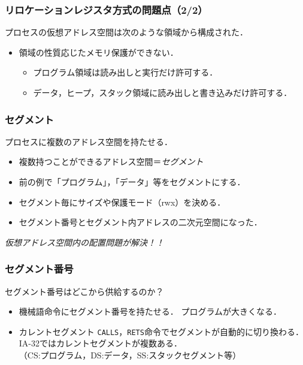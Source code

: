 \documentclass[unicode,handout]{beamer}                   %
\begin{document}
\begin{frame}
  \frametitle{リロケーションレジスタ方式の問題点（2/2）}
  プロセスの仮想アドレス空間は次のような領域から構成された．
  \vspace{3mm}
  \begin{itemize}
  \item 領域の性質応じたメモリ保護ができない．\\
    \begin{itemize}
    \item プログラム領域は読み出しと実行だけ許可する．
    \item データ，ヒープ，スタック領域に読み出しと書き込みだけ許可する．
    \end{itemize}
  \end{itemize}
\end{frame}

\begin{frame}
  \frametitle{セグメント}
  プロセスに複数のアドレス空間を持たせる．
  \vspace{3mm}
  \begin{itemize}
  \item 複数持つことができるアドレス空間＝\emph{セグメント}
  \item 前の例で「プログラム」，「データ」等をセグメントにする．
  \item セグメント毎にサイズや保護モード（rwx）を決める．
  \item セグメント番号とセグメント内アドレスの二次元空間になった．
  \end{itemize}
  \emph{仮想アドレス空間内の配置問題が解決！！}
\end{frame}

\begin{frame}
  \frametitle{セグメント番号}
  セグメント番号はどこから供給するのか？
  \begin{itemize}
  \item 機械語命令にセグメント番号を持たせる．
    \vspace{3mm}
    プログラムが大きくなる．
  \item カレントセグメント
    \texttt{CALLS}，\texttt{RETS}命令でセグメントが自動的に切り換わる．\\
    IA-32ではカレントセグメントが複数ある．\\
    （CS:プログラム，DS:データ，SS:スタックセグメント等）
  \end{itemize}
\end{frame}
\end{document}
